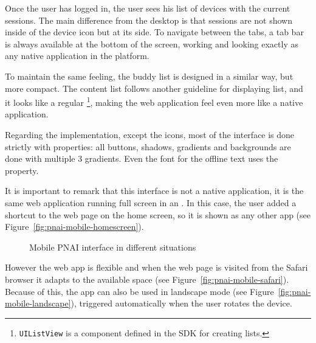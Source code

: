 Once the user has logged in, the user sees his list of devices with the current sessions.
The main difference from the desktop is that sessions are not shown inside of the device icon but at its side.
To navigate between the tabs, a tab bar is always available at the bottom of the screen, working and looking exactly as any native application in the  platform.

To maintain the same feeling, the buddy list is designed in a similar way, but more compact.
The content list follows another  guideline for displaying list, and it looks like a regular \footnote{\texttt{UIListView} is a component defined in the  SDK for creating lists.}, making the web application feel even more like a native application.

Regarding the implementation, except the icons, most of the interface is done strictly with  properties:
all buttons, shadows, gradients and backgrounds are done with multiple 3 gradients.
Even the font for the offline text uses the  property.

It is important to remark that this interface is not a native application, it is the same web application running full screen in an .
In this case, the user added a shortcut to the  web page on the home screen, so it is shown as any other app (see Figure~\vref{fig:pnai-mobile-homescreen}).

\begin{figure}[htbp]
  \centering
  \caption{Mobile PNAI interface in different situations}
  \label{fig:pnai-mobile-flexible}
\end{figure}

However the web app is flexible and when the web page is visited from the Safari browser it adapts to the available space (see Figure~\vref{fig:pnai-mobile-safari}).
Because of this, the app can also be used in landscape mode (see Figure~\vref{fig:pnai-mobile-landscape}), triggered automatically when the user rotates the device.

